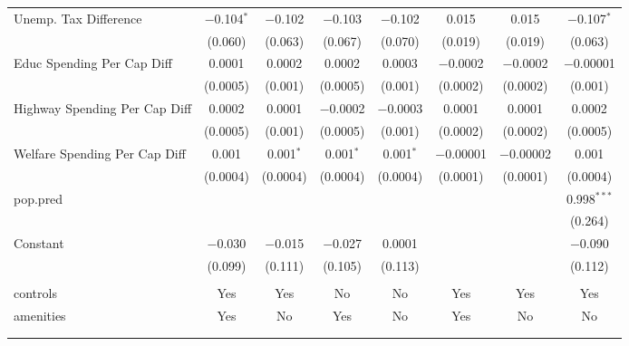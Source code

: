 \begin{table}[!htbp]
\begin{tabular}{@{\extracolsep{5pt}}lccccccc}
  Unemp. Tax Difference & $-$0.104$^{*}$ & $-$0.102 & $-$0.103 & $-$0.102 & 0.015 & 0.015 & $-$0.107$^{*}$ \\ 
  & (0.060) & (0.063) & (0.067) & (0.070) & (0.019) & (0.019) & (0.063) \\ 
  Educ Spending Per Cap Diff & 0.0001 & 0.0002 & 0.0002 & 0.0003 & $-$0.0002 & $-$0.0002 & $-$0.00001 \\ 
  & (0.0005) & (0.001) & (0.0005) & (0.001) & (0.0002) & (0.0002) & (0.001) \\ 
  Highway Spending Per Cap Diff & 0.0002 & 0.0001 & $-$0.0002 & $-$0.0003 & 0.0001 & 0.0001 & 0.0002 \\ 
  & (0.0005) & (0.001) & (0.0005) & (0.001) & (0.0002) & (0.0002) & (0.0005) \\ 
  Welfare Spending Per Cap Diff & 0.001 & 0.001$^{*}$ & 0.001$^{*}$ & 0.001$^{*}$ & $-$0.00001 & $-$0.00002 & 0.001 \\ 
  & (0.0004) & (0.0004) & (0.0004) & (0.0004) & (0.0001) & (0.0001) & (0.0004) \\ 
  pop.pred &  &  &  &  &  &  & 0.998$^{***}$ \\ 
  &  &  &  &  &  &  & (0.264) \\ 
  Constant & $-$0.030 & $-$0.015 & $-$0.027 & 0.0001 &  &  & $-$0.090 \\ 
  & (0.099) & (0.111) & (0.105) & (0.113) &  &  & (0.112) \\ 
 \hline \\[-1.8ex] 
controls & Yes & Yes & No & No & Yes & Yes & Yes \\ 
amenities & Yes & No & Yes & No & Yes & No & No \\ 
\hline \\[-1.8ex] 
\hline 
\hline \\[-1.8ex] 
\end{tabular} 
\end{table} 
